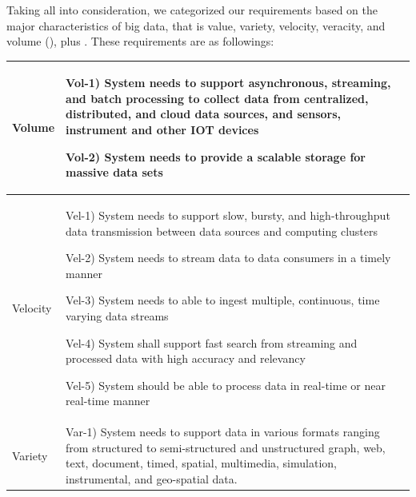 \documentclass[conference]{IEEEtran}
\begin{document}
Taking all into consideration, we categorized our requirements based on the major characteristics of big data, that is value, variety, velocity, veracity, and volume (\cite{ataei}), plus  . These requirements are as followings: 

\newcommand\rownumber{\stepcounter{magicrownumbers}\arabic{magicrownumbers}}

\begin{center}
    \begin{table}
    \renewcommand*{\arraystretch}{1.8}
    \begin{tabular}{ | m{1.2cm} | m{14cm} |}

        \hline

        Volume &

        Vol-1) System needs to support asynchronous, streaming, and batch processing to collect data from centralized, distributed, and cloud data sources, and sensors, instrument and other IOT devices 
        
        Vol-2) System needs to provide a scalable storage for massive data sets 
 
        \\

        \hline

        Velocity & 
        
        Vel-1) System needs to support slow, bursty, and high-throughput data transmission between data sources and computing clusters
        
        Vel-2) System needs to stream data to data consumers in a timely manner 

        Vel-3) System needs to able to ingest multiple, continuous, time varying data streams 

        Vel-4) System shall support fast search from streaming and processed data with high accuracy and relevancy 
        
        Vel-5) System should be able to process data in real-time or near real-time manner 
    
        \\ 

        \hline

        Variety & 

        Var-1) System needs to support data in various formats ranging from structured to semi-structured and unstructured graph, web, text, document, timed, spatial, multimedia, simulation, instrumental, and geo-spatial data. 


\end{tabular}
\end{table}
\end{center}
\end{document}
